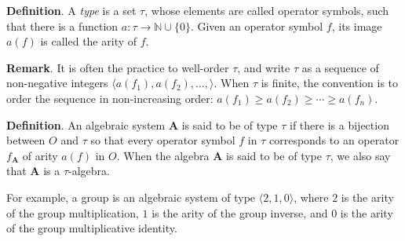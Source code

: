 \documentclass[12pt]{article}
\theoremstyle{definition}
\begin{document}
\textbf{Definition}.  A \emph{type} is a set $\tau$, whose elements are called operator symbols, such that there is a function $a:\tau \to \mathbb{N}\cup \lbrace 0\rbrace$.  Given an operator symbol $f$, its image $a(f)$ is called the arity of $f$.

\textbf{Remark}.  It is often the practice to well-order $\tau$, and write $\tau$ as a sequence of non-negative integers $\langle a(f_1), a(f_2), \ldots, \rangle$.  When $\tau$ is finite, the convention is to order the sequence in non-increasing order: $a(f_1)\ge a(f_2)\ge \cdots \ge a(f_n)$.

\textbf{Definition}.  An algebraic system $\boldsymbol{A}$ is said to be of type $\tau$ if there is a bijection between $O$ and $\tau$ so that every operator symbol $f$ in $\tau$ corresponds to an operator $f_{\boldsymbol{A}}$ of arity $a(f)$ in $O$.  When the algebra $\boldsymbol{A}$ is said to be of type $\tau$, we also say that $\boldsymbol{A}$ is a $\tau$-algebra.

For example, a group is an algebraic system of type $\langle 2,1,0\rangle$, where $2$ is the arity of the group multiplication, $1$ is the arity of the group inverse, and $0$ is the arity of the group multiplicative identity.



\end{document}

